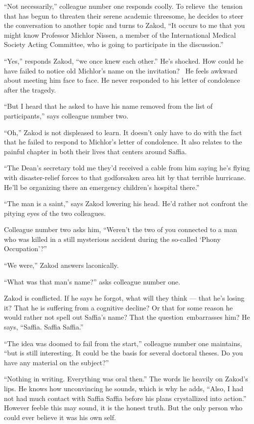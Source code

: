 \documentclass[twoside,11pt]{book}
\begin{document}
``Not necessarily,'' colleague number one responds coolly. To relieve~the~tension that has
begun to threaten their serene academic threesome, he decides to steer the conversation to another topic and turns to
Zakod, ``It occurs to me that you might know Professor Michlor Nissen, a member of the International
Medical Society Acting Committee, who is going to participate in the discussion.''

``Yes,'' responds Zakod, ``we once knew each other.'' He's shocked.
How could he have failed to notice old Michlor's name on the invitation? ~He feels awkward about meeting  him face to
face. He never responded to his letter of condolence after the tragedy.

``But I heard that he asked to have his name removed from the list of participants,'' says
colleague number two.

``Oh,'' Zakod is not displeased to learn. It doesn't only have to do with the fact that he
failed to respond to Michlor's letter of condolence. It also relates to the painful chapter in both their lives that
centers around Saffia.

``The Dean's secretary told me they'd received a cable from him saying he's flying with disaster-relief
forces to{ }that godforsaken area hit by that terrible hurricane. He'll be organizing there an
emergency children's hospital there.''

``The man is a saint,'' says Zakod lowering his head. He'd rather not confront the pitying
eyes of the two colleagues.

Colleague number two asks him, ``Weren't the two of you connected to a man who was killed in a still
mysterious accident during the so-called `Phony Occupation'?''

``We were,'' Zakod answers laconically.

``What was that man's name?'' asks colleague number one.

Zakod is conflicted. If he says he forgot, what will they think --- that he's losing it?{ }That he is
suffering from a cognitive decline? Or that for some reason he would rather not spell out Saffia's name? That the
question~embarrasses him? He says, ``Saffia. Saffia Saffia.''

``The idea was doomed to fail from the start,'' colleague number one maintains, ``but is still
interesting. It could be the basis for several doctoral theses. Do you have any material on the subject?''


``Nothing in writing. Everything was oral then.'' The words lie heavily on Zakod's lips. He
knows how unconvincing he sounds, which is why he adds, ``Also, I had not had much contact with Saffia
Saffia before his plans crystallized into action.'' However feeble this may sound, it is the honest truth.
But the only person who could ever believe it was his own self.
\end{document}
